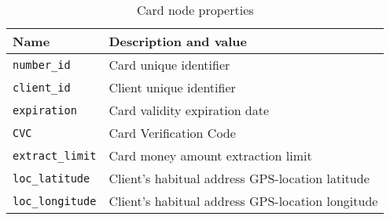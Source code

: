 \begin{table}[H]
    \centering
    \begin{tabular}{|l|l|}
    \hline
    \textbf{Name}        & \textbf{Description and value}                                          \\ \hline
    \texttt{number\_id}   & Card unique identifier                               \\ \hline
    \texttt{client\_id}   & Client unique identifier                               \\ \hline
    \texttt{expiration}   & Card validity expiration date                      \\ \hline
    \texttt{CVC}          & Card Verification Code                                      \\ \hline
    \texttt{extract\_limit} & Card money amount extraction limit    \\ \hline
    \texttt{loc\_latitude}  & Client's habitual address GPS-location latitude                         \\ \hline
    \texttt{loc\_longitude} & Client's habitual address GPS-location longitude                        \\ \hline
    \end{tabular}
    \caption{Card node properties}
    \label{table:card-node-properties}
\end{table}